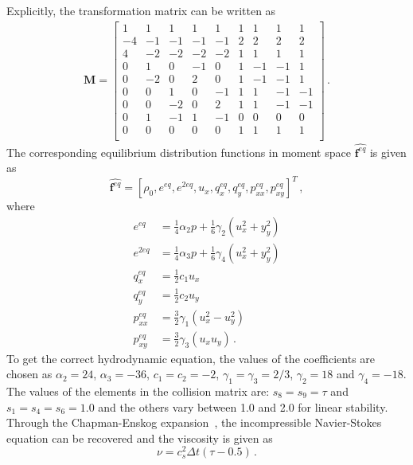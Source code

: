 Explicitly, the transformation matrix can be written as
%
\begin{align}
\mathbf{M}= \begin{bmatrix}
1 &  1 &  1 &  1 &  1 &  1 &  1 &  1 &  1 \\
-4 & -1 & -1 & -1 & -1 &  2 &  2 &  2 &  2 \\ 
4 & -2 & -2 & -2 & -2 &  1 &  1 &  1 &  1 \\
0 &  1 &  0 & -1 &  0 &  1 & -1 & -1 &  1 \\
0 & -2 &  0 &  2 &  0 &  1 & -1 & -1 &  1 \\
0 &  0 &  1 &  0 & -1 &  1 &  1 & -1 & -1 \\
0 &  0 & -2 &  0 &  2 &  1 &  1 & -1 & -1 \\
0 &  1 & -1 &  1 & -1 &  0 &  0 &  0 &  0 \\
0 &  0 &  0 &  0 &  0 &  1 &  1 &  1 &  1 \\
\end{bmatrix}\,.
\end{align}
%
The corresponding equilibrium distribution functions in moment space 
$\widehat{\mathbf{f}^{eq}}$ is given as
%
\begin{equation}
\widehat{\mathbf{f}^{eq}}=\left[\rho_0,e^{eq}, 
e^{2eq},u_x,q_x^{eq},q_y^{eq},p_{xx}^{eq},p_{xy}^{eq}\right]^T\,,
\end{equation}
%
\noindent where
%
\begin{subequations}
\begin{align}
e^{eq} & = \frac{1}{4}\alpha_2p+\frac{1}{6}\gamma_2(u_x^2+y_y^2)\\
e^{2eq} & = \frac{1}{4}\alpha_3p+\frac{1}{6}\gamma_4(u_x^2+y_y^2)\\
q_x^{eq} & = \frac{1}{2}c_1u_x\\
q_y^{eq} & = \frac{1}{2}c_2u_y \\
p_{xx}^{eq} & = \frac{3}{2}\gamma_1(u_x^2 - u_y^2)\\
p_{xy}^{eq} & = \frac{3}{2}\gamma_3(u_xu_y) \,.
\end{align}
\end{subequations}
%
To get the correct hydrodynamic equation, the values of the coefficients are 
chosen as $\alpha_2=24$,  $\alpha_3=-36$, $c_1=c_2=-2$, 
$\gamma_1=\gamma_3=2/3$, $\gamma_2=18$ and $\gamma_4=-18$. The values of the 
elements in the collision matrix are: $s_8 = s_9 = \tau$ 
and $s_1=s_4=s_6=1.0$ and the others vary between 1.0 and 2.0 for linear 
stability. Through the Chapman-Enskog expansion~\citep{Du2006}, the 
incompressible Navier-Stokes equation can be recovered and the viscosity is 
given as
%
\begin{equation}
\nu=c_s^2\Delta t(\tau-0.5)\,.
\end{equation}

